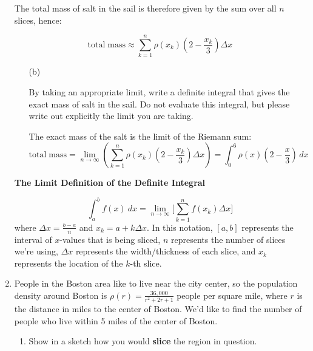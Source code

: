 \documentclass[main]{subfiles}
\begin{document}
\begin{enumerate}
\begin{solution}
{The total mass of salt in the sail is therefore given by the sum over all $n$ slices, hence:

\[ \boxed{\mathrm{total\; mass} \approx \sum_{k=1}^n \rho(x_k)\left(2-\frac{x_k}{3}\right) \Delta x }\]
}
\end{solution}


\begin{enumerate}
\item[(b)]
\begin{problem}[1.25in]
By taking an appropriate limit, write a definite integral that gives
      the exact mass of salt in the sail.  Do not evaluate this integral, but please write out explicitly the limit you are taking.
\end{problem}

\begin{solution}
The exact mass of the salt is the limit of the Riemann sum:
\[\mathrm{total\; mass} = \lim_{n\rightarrow \infty} \left(  \sum_{k=1}^n \rho(x_k)\left(2-\frac{x_k}{3}\right) \Delta x \right) = \boxed{\int_0^6 \rho(x) \left(2-\frac{x}{3}\right)\,dx} \]
\end{solution}

\end{enumerate}


\probonly{\newpage}

\begin{framed}
\centerline{\textbf{The Limit Definition of the Definite Integral}}

$$\boxed{\int_a^b f(x)\ dx = \lim_{n \to \infty}\Bigg[ \sum_{k=1}^n f(x_k)\Delta x\Bigg]}$$
where $\boxed{\Delta x = \frac{b-a}{n}}$ and $\boxed{x_k=a+k\Delta x}$. In this notation, $[a, b]$ represents the interval of $x$-values that is being sliced, $n$ represents the number of slices we're using, $\Delta x$ represents the width/thickness of each slice, and $x_k$ represents the location of the $k$-th slice.

\end{framed}
  
\item  \label{density-concentric-rings-1}

  People in the Boston area like to live near the city center, so the
  population density around Boston is $\rho(r) = \frac{36,000}{r^2 + 2r +
    1}$ people per square mile, where $r$ is the distance in miles to the
  center of Boston.  We'd like to find the number of people who live
  within 5 miles of the center of Boston.

  \begin{enumerate}
  \item
    \begin{problem}[\vfill]
      Show in a sketch how you would \textbf{slice} the region in question.
    \end{problem}    


\end{enumerate}
\end{enumerate}
\end{document}
